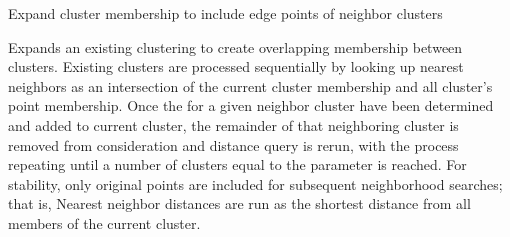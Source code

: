 \documentclass[letterpaper,10pt,english]{sphinxmanual}
\begin{document}
\begin{fulllineitems}
\label{\detokenize{pgamit.classes:pgamit.classes.NetClusters.over_cluster}}
\pysigstartsignatures
\pysiglinewithargsret
{}
{\sphinxparamcomma {}\sphinxparamcomma {}\sphinxparamcomma {}\sphinxparamcomma {}\sphinxparamcomma {}\sphinxparamcomma {}\sphinxparamcomma {}\sphinxparamcomma {}}
{}
\pysigstopsignatures
\sphinxAtStartPar
Expand cluster membership to include edge points of neighbor clusters

\sphinxAtStartPar
Expands an existing clustering to create overlapping membership between
clusters. Existing clusters are processed sequentially by looking up
nearest neighbors as an intersection of the current cluster membership and
all cluster’s point membership.  Once the  for a given
neighbor cluster have been determined and added to current cluster, the
remainder of that neighboring cluster is removed from consideration and
distance query is rerun, with the process repeating until a number of
clusters equal to the  parameter is reached. For stability,
only original points are included for subsequent neighborhood searches;
that is, Nearest neighbor distances are run as the shortest distance from
all  members of the current cluster.


\end{fulllineitems}
\end{document}

